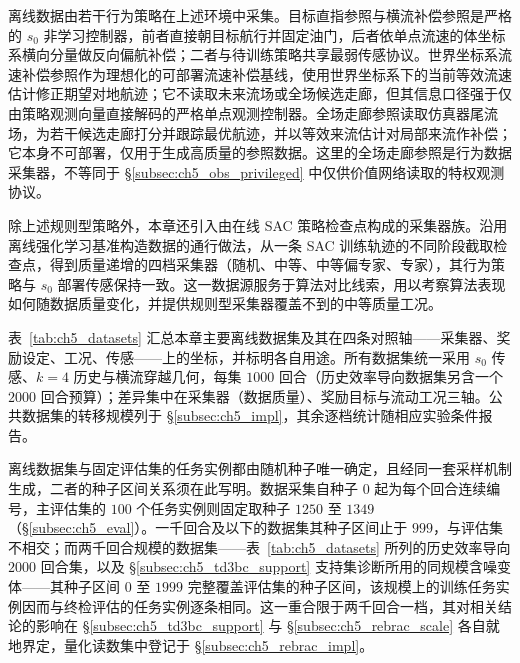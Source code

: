 离线数据由若干行为策略在上述环境中采集。目标直指参照与横流补偿参照是严格的 $s_0$ 非学习控制器，前者直接朝目标航行并固定油门，后者依单点流速的体坐标系横向分量做反向偏航补偿；二者与待训练策略共享最弱传感协议。世界坐标系流速补偿参照作为理想化的可部署流速补偿基线，使用世界坐标系下的当前等效流速估计修正期望对地航迹；它不读取未来流场或全场候选走廊，但其信息口径强于仅由策略观测向量直接解码的严格单点观测控制器。全场走廊参照读取仿真器尾流场，为若干候选走廊打分并跟踪最优航迹，并以等效来流估计对局部来流作补偿；它本身不可部署，仅用于生成高质量的参照数据。这里的全场走廊参照是行为数据采集器，不等同于 \S\ref{subsec:ch5_obs_privileged} 中仅供价值网络读取的特权观测协议。

除上述规则型策略外，本章还引入由在线 SAC 策略检查点构成的采集器族。沿用离线强化学习基准构造数据的通行做法，从一条 SAC 训练轨迹的不同阶段截取检查点，得到质量递增的四档采集器（随机、中等、中等偏专家、专家），其行为策略与 $s_0$ 部署传感保持一致。这一数据源服务于算法对比线索，用以考察算法表现如何随数据质量变化，并提供规则型采集器覆盖不到的中等质量工况。

表~\ref{tab:ch5_datasets} 汇总本章主要离线数据集及其在四条对照轴——采集器、奖励设定、工况、传感——上的坐标，并标明各自用途。所有数据集统一采用 $s_0$ 传感、$k=4$ 历史与横流穿越几何，每集 $1000$ 回合（历史效率导向数据集另含一个 $2000$ 回合预算）；差异集中在采集器（数据质量）、奖励目标与流动工况三轴。公共数据集的转移规模列于 \S\ref{subsec:ch5_impl}，其余逐档统计随相应实验条件报告。

离线数据集与固定评估集的任务实例都由随机种子唯一确定，且经同一套采样机制生成，二者的种子区间关系须在此写明。数据采集自种子 $0$ 起为每个回合连续编号，主评估集的 $100$ 个任务实例则固定取种子 $1250$ 至 $1349$（\S\ref{subsec:ch5_eval}）。一千回合及以下的数据集其种子区间止于 $999$，与评估集不相交；而两千回合规模的数据集——表~\ref{tab:ch5_datasets} 所列的历史效率导向 $2000$ 回合集，以及 \S\ref{subsec:ch5_td3bc_support} 支持集诊断所用的同规模含噪变体——其种子区间 $0$ 至 $1999$ 完整覆盖评估集的种子区间，该规模上的训练任务实例因而与终检评估的任务实例逐条相同。这一重合限于两千回合一档，其对相关结论的影响在 \S\ref{subsec:ch5_td3bc_support} 与 \S\ref{subsec:ch5_rebrac_scale} 各自就地界定，量化读数集中登记于 \S\ref{subsec:ch5_rebrac_impl}。

